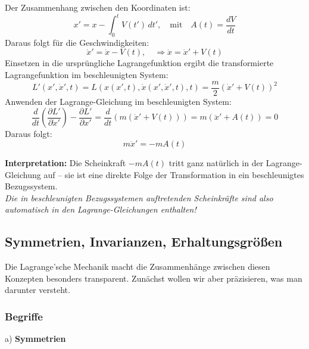 \documentclass[10pt, letterpaper]{article}
\begin{document}
\begin{center}
\end{center}

Der Zusammenhang zwischen den Koordinaten ist:
\[
x' = x - \int_0^t V(t') \, dt', 
\quad \text{mit} \quad A(t) = \frac{dV}{dt}
\]
Daraus folgt für die Geschwindigkeiten:
\[
\dot{x}' = \dot{x} - V(t), 
\quad \Rightarrow \dot{x} = \dot{x}' + V(t)
\]
Einsetzen in die ursprüngliche Lagrangefunktion ergibt die transformierte Lagrangefunktion im beschleunigten System:
\[
L'(x', \dot{x}', t) = L(x(x', t), \dot{x}(x', \dot{x}', t), t) = \frac{m}{2}(\dot{x}' + V(t))^2
\]
Anwenden der Lagrange-Gleichung im beschleunigten System:
\[
\frac{d}{dt} \left( \frac{\partial L'}{\partial \dot{x}'} \right) - \frac{\partial L'}{\partial x'} 
= \frac{d}{dt} \left( m (\dot{x}' + V(t)) \right) = m (\ddot{x}' + A(t)) = 0
\]
Daraus folgt:
\[
m \ddot{x}' = -m A(t)
\]

\noindent\textbf{Interpretation:}  
Die Scheinkraft \( -mA(t) \) tritt ganz natürlich in der Lagrange-Gleichung auf – sie ist eine direkte Folge der Transformation in ein beschleunigtes Bezugssystem.  
\\[1ex]
\textit{Die in beschleunigten Bezugssystemen auftretenden Scheinkräfte sind also automatisch in den Lagrange-Gleichungen enthalten!}









\pagebreak



\subsection{Symmetrien, Invarianzen, Erhaltungsgrößen}

Die Lagrange'sche Mechanik macht die Zusammenhänge zwischen diesen Konzepten besonders transparent. Zunächst wollen wir aber präzisieren, was man darunter versteht.

\subsubsection{Begriffe}

a) \textbf{Symmetrien}
\end{document}
